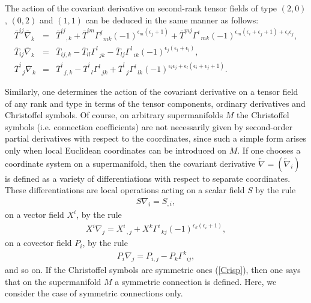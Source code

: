 \documentclass[a4paper,11pt]{article}
\begin{document}
The action of the covariant derivative on second-rank tensor fields of type $%
(2,0)$, $(0,2)$ and $(1,1)$ can be deduced in the same manner as follows:
\begin{eqnarray}
{\bar T}^{ij}{\bar \nabla}_k&=&
{\bar T}^{ij}_{\;\;\;,k} +
{\bar T}^{im}\Gamma^j_{\;\;mk}(-1)^{\epsilon_m(\epsilon_j+1)}+
{\bar T}^{mj}\Gamma^i_{\;\;mk}
(-1)^{\epsilon_m(\epsilon_i+\epsilon_j+1)+\epsilon_i\epsilon_j},\\
{\bar T}_{ij}{\bar \nabla}_k&=&
{\bar T}_{ij,k}
-{\bar T}_{il}\Gamma^l_{\;\;jk}-
{\bar T}_{lj}\Gamma^l_{\;\;ik}
(-1)^{\epsilon_j(\epsilon_i+\epsilon_l)},\\
{\bar T}^i_{\;\;j}{\bar \nabla}_k&=&
{\bar T}^i_{\;\;j,k} -
{\bar T}^i_{\;\;l}\Gamma^l_{\;\;jk}
+{\bar T}^l_{\;\;j}\Gamma^i_{\;\;lk}
(-1)^{\epsilon_i\epsilon_j+\epsilon_l(\epsilon_i+\epsilon_j+1)}.
\end{eqnarray}

Similarly, one determines the action of the covariant derivative on a tensor
field of any rank and type in terms of the tensor components, ordinary
derivatives and Christoffel symbols. Of course, on arbitrary supermanifolds $%
M$ the Christoffel symbols (i.e. connection coefficients) are not
necessarily given by second-order partial derivatives with respect to the
coordinates, since such a simple form arises only when local Euclidean
coordinates can be introduced on $M$. If one chooses a coordinate system on
a supermanifold, then the covariant derivative $\overleftarrow{\nabla }=(%
\overleftarrow{\nabla }_{i})$ is defined as a variety of
differentiations with respect to separate coordinates. These
differentiations are local operations acting on a scalar field $S$
by the rule
\begin{eqnarray}
\label{scal} S\nabla_i=S_{,i},
\end{eqnarray}
on a vector field $X^{i}$, by the rule
\begin{eqnarray}
\label{vector} X^i\nabla_j=X^i_{\;\;,j}+ X^k\Gamma^i_{\;\;kj}
(-1)^{\epsilon_k(\epsilon_i+1)},
\end{eqnarray}
on a covector field $P_{i}$, by the rule
\begin{eqnarray}
P_i\nabla_j=P_{i,j}-P_k\Gamma^k_{\;\;ij},
\end{eqnarray}
and so on. If the Christoffel symbols are symmetric ones (\ref{Crisp}), then
one says that on the supermanifold $M$ a symmetric connection is defined.
Here, we consider the case of symmetric connections only.
\end{document}
